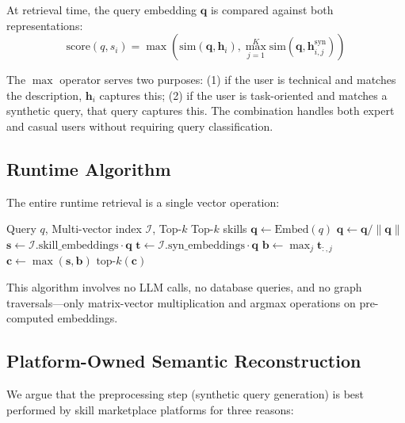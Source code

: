 \documentclass[11pt,a4paper]{article}
\begin{document}
At retrieval time, the query embedding $\mathbf{q}$ is compared against both representations:
\begin{equation}
\text{score}(q, s_i) = \max\left( \text{sim}(\mathbf{q}, \mathbf{h}_i), \max_{j=1}^{K} \text{sim}(\mathbf{q}, \mathbf{h}_{i,j}^{\text{syn}}) \right)
\end{equation}

The $\max$ operator serves two purposes: (1) if the user is technical and matches the description, $\mathbf{h}_i$ captures this; (2) if the user is task-oriented and matches a synthetic query, that query captures this. The combination handles both expert and casual users without requiring query classification.

\subsection{Runtime Algorithm}

The entire runtime retrieval is a single vector operation:

\begin{algorithm}[h]
\caption{Zero-Token Skill Retrieval}
\label{alg:retrieval}
\begin{algorithmic}[1]
\Require Query $q$, Multi-vector index $\mathcal{I}$, Top-$k$
\Ensure Top-$k$ skills
\State $\mathbf{q} \gets \text{Embed}(q)$
\State $\mathbf{q} \gets \mathbf{q} / \|\mathbf{q}\|$
\State $\mathbf{s} \gets \mathcal{I}.\text{skill\_embeddings} \cdot \mathbf{q}$ 
\State $\mathbf{t} \gets \mathcal{I}.\text{syn\_embeddings} \cdot \mathbf{q}$ 
\State $\mathbf{b} \gets \max_j \mathbf{t}_{:,j}$ 
\State $\mathbf{c} \gets \max(\mathbf{s}, \mathbf{b})$ 
\State \Return $\text{top-}k(\mathbf{c})$
\end{algorithmic}
\end{algorithm}

This algorithm involves no LLM calls, no database queries, and no graph traversals---only matrix-vector multiplication and argmax operations on pre-computed embeddings.

\subsection{Platform-Owned Semantic Reconstruction}
\label{sec:platform}

We argue that the preprocessing step (synthetic query generation) is best performed by skill marketplace platforms for three reasons:
\end{document}
